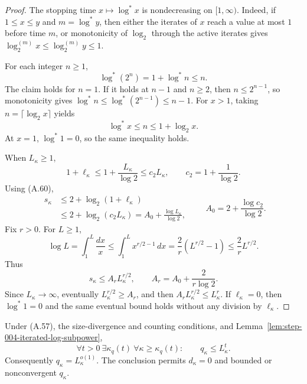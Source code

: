 \begin{proof}
The stopping time \(x\mapsto\log^*x\) is nondecreasing on
\([1,\infty)\).  Indeed, if \(1\leq x\leq y\) and
\(m=\log^*y\), then either the iterates of \(x\) reach a value at most
\(1\) before time \(m\), or monotonicity of \(\log_2\) through the
active iterates gives
\(\log_2^{(m)}x\leq\log_2^{(m)}y\leq1\).

For each integer \(n\geq1\),
\[
\log^*(2^n)=1+\log^*n\leq n.
\tag{A.59}
\]
The claim holds for \(n=1\).  If it holds at \(n-1\) and \(n\geq2\),
then \(n\leq2^{n-1}\), so monotonicity gives
\(\log^*n\leq\log^*(2^{n-1})\leq n-1\).  For \(x>1\), taking
\(n=\lceil\log_2x\rceil\) yields
\[
\log^*x
\leq n
\leq1+\log_2x.
\tag{A.60}
\]
At \(x=1\), \(\log^*1=0\), so the same inequality holds.

When \(L_\kappa\geq1\),
\[
1+\ell_\kappa
\leq1+\frac{L_\kappa}{\log2}
\leq c_2L_\kappa,
\qquad
c_2=1+\frac1{\log2}.
\tag{A.61}
\]
Using (A.60),
\[
\begin{aligned}
s_\kappa
&\leq2+\log_2(1+\ell_\kappa)\\
&\leq2+\log_2(c_2L_\kappa)
=A_0+\frac{\log L_\kappa}{\log2},
\end{aligned}
\qquad
A_0=2+\frac{\log c_2}{\log2}.
\tag{A.62}
\]
Fix \(r>0\).  For \(L\geq1\),
\[
\log L
=\int_1^L\frac{dx}{x}
\leq\int_1^Lx^{r/2-1}\,dx
=\frac2r(L^{r/2}-1)
\leq\frac2rL^{r/2}.
\tag{A.63}
\]
Thus
\[
s_\kappa\leq
A_rL_\kappa^{r/2},
\qquad
A_r=A_0+\frac{2}{r\log2}.
\tag{A.64}
\]
Since \(L_\kappa\to\infty\), eventually
\(L_\kappa^{r/2}\geq A_r\), and then
\(A_rL_\kappa^{r/2}\leq L_\kappa^r\).  If
\(\ell_\kappa=0\), then \(\log^*1=0\) and the same eventual bound
holds without any division by \(\ell_\kappa\).
\end{proof}

\begin{proposition}
\label{prop:step-004-q-subpower}
Under (A.57), the size-divergence and counting conditions, and
Lemma~\ref{lem:step-004-iterated-log-subpower},
\[
\forall t>0\ \exists\kappa_q(t)\
\forall\kappa\geq\kappa_q(t):
\qquad q_\kappa\leq L_\kappa^t.
\tag{A.65}
\]
Consequently \(q_\kappa=L_\kappa^{o(1)}\).  The conclusion permits
\(d_\kappa=0\) and bounded or nonconvergent \(q_\kappa\).
\end{proposition}

